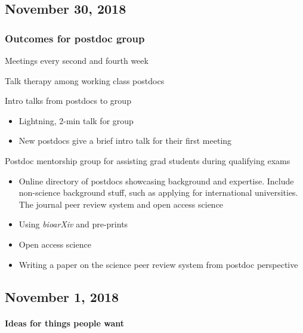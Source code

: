 \documentclass[10,portrait]{article}
\let\oldparagraph\paragraph
\renewcommand{\paragraph}[1]{\oldparagraph{#1}\mbox{}}
\begin{document}
\newpage  

\subsection{November 30, 2018}\label{november-30-2018}

\subsubsection{Outcomes for postdoc
group}\label{outcomes-for-postdoc-group}

Meetings every second and fourth week

Talk therapy among working class postdocs

Intro talks from postdocs to group

\begin{itemize}
\item
  Lightning, 2-min talk for group
\item
  New postdocs give a brief intro talk for their first meeting
\end{itemize}

Postdoc mentorship group for assisting grad students during qualifying
exams

\begin{itemize}
\item
  Online directory of postdocs showcasing background and expertise.
  Include non-science background stuff, such as applying for
  international universities.\\
  The journal peer review system and open access science
\item
  Using \emph{bioarXiv} and pre-prints\\
\item
  Open access science\\
\item
  Writing a paper on the science peer review system from postdoc
  perspective
\end{itemize}

\newpage  

\subsection{November 1, 2018}\label{november-1-2018}

\paragraph{Ideas for things people
want}\label{ideas-for-things-people-want}
\end{document}
